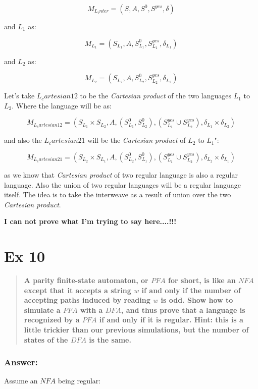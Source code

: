 \documentclass[titlepage]{article}\usepackage[]{graphicx}\usepackage[]{color}
\begin{document}
\[ 
  M_{L_inter} = (S, A, S^0, S^{yes}, \delta)
\]

and $L_1$ as:

\[ 
  M_{L_1} = (S_{L_1}, A, S_{L_1}^0, S_{L_1}^{yes}, \delta_{L_1})
\]

and $L_2$ as:

\[ 
  M_{L_2} = (S_{L_2}, A, S_{L_2}^0, S_{L_2}^{yes}, \delta_{L_2})
\]

Let's take  $L_cartesian12$ to be the \textit{Cartesian product} of the two languages $L_1$ to $L_2$. Where the language will be as: 

\[ 
  M_{L_cartesian12} = (S_{L_1} \times S_{L_2}, A, (S_{L_1}^0, S_{L_2}^0), (S_{L_1}^{yes} \cup S_{L_2}^{yes}), \delta_{L_1} \times \delta_{L_2} )
\]

and also the $L_cartesian21$ will be the \textit{Cartesian product} of $L_2$ to $L_1$":

\[ 
  M_{L_cartesian21} = (S_{L_2} \times S_{L_1}, A, (S_{L_2}^0, S_{L_1}^0), (S_{L_1}^{yes} \cup S_{L_2}^{yes}), \delta_{L_2} \times \delta_{L_1} )
\]

as we know that \textit{Cartesian product} of two regular language is also a regular language. Also the union of two regular languages will be a regular language itself. The idea is to take the interweave as a result of union over the two \textit{Cartesian product}.

\textbf{I can not prove what I'm trying to say here....!!!}
\vspace{1cm}



\section*{Ex 10}
\begin{quote}
  \textbf{
  A parity finite-state automaton, or $PFA$ for short, is like an $NFA$ except that it accepts a string $w$ if and only if the number of accepting paths induced by reading $w$ is odd. Show how to simulate a $PFA$ with a $DFA$, and thus prove that a language is recognized by a $PFA$ if and only if it is regular. Hint: this is a little trickier than our
  previous simulations, but the number of states of the $DFA$ is the same.}
\end{quote}

\subsubsection*{Answer:}
Assume an $NFA$ being regular:
\end{document}
